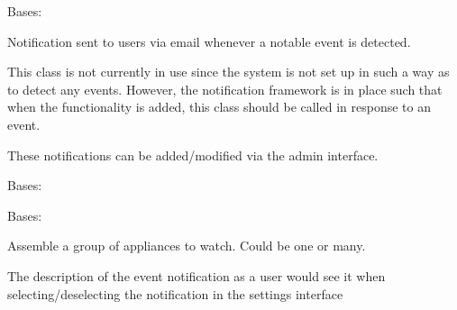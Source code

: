 \documentclass[letterpaper,10pt,english]{sphinxmanual}
\begin{document}
\begin{fulllineitems}
\label{modules/webapp:webapp.models.EventNotification}
Bases: 

Notification sent to users via email whenever a notable event is detected.

This class is not currently in use since the system is not set up in such
a way as to detect any events. However, the notification framework is in
place such that when the functionality is added, this class should be called
in response to an event.

These notifications can be added/modified via the admin interface.

\begin{fulllineitems}
\label{modules/webapp:webapp.models.EventNotification.DoesNotExist}
Bases: 

\end{fulllineitems}


\begin{fulllineitems}
\label{modules/webapp:webapp.models.EventNotification.MultipleObjectsReturned}
Bases: 

\end{fulllineitems}


\begin{fulllineitems}
\label{modules/webapp:webapp.models.EventNotification.appliances_to_watch}
Assemble a group of appliances to watch. Could be one or many.

\end{fulllineitems}


\begin{fulllineitems}
\label{modules/webapp:webapp.models.EventNotification.description}
The description of the event notification as a user would see it when selecting/deselecting the notification in the settings interface


\end{fulllineitems}
\end{fulllineitems}
\end{document}
